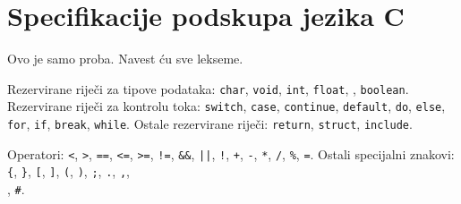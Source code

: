 \section{Specifikacije podskupa jezika C}

Ovo je samo proba. Navest ću sve lekseme.

Rezervirane riječi za tipove podataka:  \texttt{char}, \texttt{void}, 
\texttt{int}, \texttt{float}, , \texttt{boolean}.
Rezervirane riječi za kontrolu toka: \texttt{switch}, \texttt{case}, 
 \texttt{continue},  \texttt{default}, \texttt{do}, \texttt{else}, \texttt{for}, 
 \texttt{if}, \texttt{break},  \texttt{while}.
Ostale rezervirane riječi: \texttt{return},  \texttt{struct}, \texttt{include}.

Operatori: \texttt{<},  \texttt{>},  \texttt{==},  \texttt{<=},  \texttt{>=},  \texttt{!=}, 
 \texttt{\&\&},  \texttt{||},  \texttt{!},  \texttt{+},  \texttt{-},  \texttt{*}, 
 \texttt{/},  \texttt{\%},  \texttt{=}.
Ostali specijalni znakovi:  \texttt{\{},  \texttt{\}},  \texttt{[},  \texttt{]},  
 \texttt{(},  \texttt{)}, \texttt{;},  \texttt{.},  \texttt{,},  \texttt{\\}, \texttt{#}.
